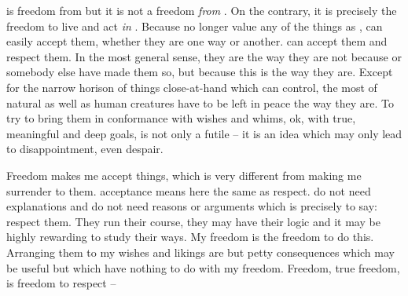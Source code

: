 \pa {} is freedom from  but it is not
a freedom {\em from} . On the contrary, it is precisely
the freedom to live and act {\em in} .  Because 
no longer value any of the  things as ,
 can easily accept them, whether they are one way or another.
 can accept them and respect them.  In the most general sense,
they are the way they are not because  or somebody else have
made them so, but because this is the way they are.  Except for the
narrow horison of things close-at-hand which  can control, the
most of natural as well as human creatures have to be left in peace
the way they are.  To try to bring them in conformance with 
wishes and whims, ok, with  true, meaningful and deep goals, is
not only a futile  -- it is an idea which may only lead
to disappointment, even despair.

Freedom makes me accept things, which is very different from making 
me surrender to them. acceptance means here the same as respect.
 do not need explanations and 
do not need reasons or arguments which is precisely to say: 
respect them.  They run their course, they may have their logic and it
may be highly rewarding to study their ways.  My freedom is the
freedom to do this.  Arranging them to my wishes and likings are but
petty consequences which may be useful but which have nothing to do
with my freedom.  Freedom, true freedom, is freedom to respect
 --  

